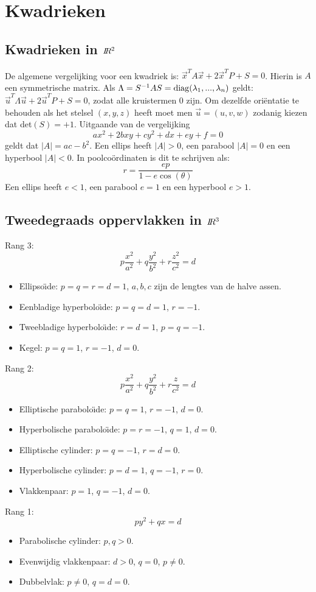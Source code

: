 \section{Kwadrieken}
\subsection{Kwadrieken in $I\hspace{-1mm}R^2$}
De algemene vergelijking voor een kwadriek is:
$\vec{x}^TA\vec{x}+2\vec{x}^TP+S=0$. Hierin is $A$ een symmetrische matrix.
Als $\Lambda=S^{-1}AS={\rm diag}(\lambda_1,...,\lambda_n)$ geldt:
$\vec{u}^T\Lambda\vec{u}+2\vec{u}^TP+S=0$, zodat alle kruistermen 0 zijn.
Om dezelfde ori\"entatie te behouden als het stelsel $(x,y,z)$ heeft moet men
$\vec{u}=(u,v,w)$ zodanig kiezen dat det$(S)=+1$.
\npar
Uitgaande van de vergelijking
\[
ax^2+2bxy+cy^2+dx+ey+f=0
\]
geldt dat $|A|=ac-b^2$. Een ellips heeft $|A|>0$, een parabool $|A|=0$ en
een hyperbool $|A|<0$. In poolco\"ordinaten is dit te schrijven als:
\[
r=\frac{ep}{1-e\cos(\theta)}
\]
Een ellips heeft $e<1$, een parabool $e=1$ en een hyperbool $e>1$.

\subsection{Tweedegraads oppervlakken in $I\hspace{-1mm}R^3$}
Rang 3:
\[
p\frac{x^2}{a^2}+q\frac{y^2}{b^2}+r\frac{z^2}{c^2}=d
\]
\begin{itemize}
\item Ellipso\"{\i}de: $p=q=r=d=1$, $a,b,c$ zijn de lengtes van de halve assen.
\item Eenbladige hyperbolo\"{\i}de: $p=q=d=1$, $r=-1$.
\item Tweebladige hyperbolo\"{\i}de: $r=d=1$, $p=q=-1$.
\item Kegel: $p=q=1$, $r=-1$, $d=0$.
\end{itemize}
Rang 2:
\[
p\frac{x^2}{a^2}+q\frac{y^2}{b^2}+r\frac{z}{c^2}=d
\]
\begin{itemize}
\item Elliptische parabolo\"{\i}de: $p=q=1$, $r=-1$, $d=0$.
\item Hyperbolische parabolo\"{\i}de: $p=r=-1$, $q=1$, $d=0$.
\item Elliptische cylinder: $p=q=-1$, $r=d=0$.
\item Hyperbolische cylinder: $p=d=1$, $q=-1$, $r=0$.
\item Vlakkenpaar: $p=1$, $q=-1$, $d=0$.
\end{itemize}
Rang 1:
\[
py^2+qx=d
\]
\begin{itemize}
\item Parabolische cylinder: $p,q>0$.
\item Evenwijdig vlakkenpaar: $d>0$, $q=0$, $p\neq 0$.
\item Dubbelvlak: $p\neq 0$, $q=d=0$.
\end{itemize}


